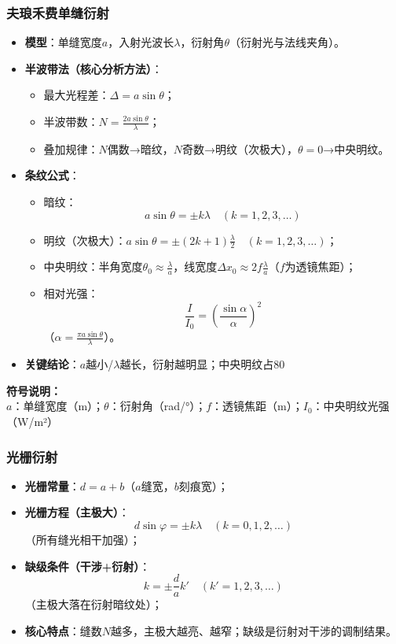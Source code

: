 \subsubsection{夫琅禾费单缝衍射}
\begin{itemize}
    \item \textbf{模型}：单缝宽度$a$，入射光波长$\lambda$，衍射角$\theta$（衍射光与法线夹角）。
    \item \textbf{半波带法（核心分析方法）}：
          \begin{itemize}
              \item 最大光程差：$\Delta = a\sin\theta$；
              \item 半波带数：$N = \frac{2a\sin\theta}{\lambda}$；
              \item 叠加规律：$N$偶数→暗纹，$N$奇数→明纹（次极大），$\theta=0$→中央明纹。
          \end{itemize}
    \item \textbf{条纹公式}：
          \begin{itemize}
              \item 暗纹：
                    \[
                    a\sin\theta = \pm k\lambda \quad (k=1,2,3,\dots)
                    \]
              \item 明纹（次极大）：$a\sin\theta = \pm (2k+1)\frac{\lambda}{2} \quad (k=1,2,3,\dots)$；
              \item 中央明纹：半角宽度$\theta_0 \approx \frac{\lambda}{a}$，线宽度$\Delta x_0 \approx 2f\frac{\lambda}{a}$（$f$为透镜焦距）；
              \item 相对光强：
                    \[
                    \frac{I}{I_0} = \left( \frac{\sin\alpha}{\alpha} \right)^2
                    \]（$\alpha = \frac{\pi a\sin\theta}{\lambda}$）。
          \end{itemize}
    \item \textbf{关键结论}：$a$越小/$\lambda$越长，衍射越明显；中央明纹占80%
\end{itemize}

\textbf{符号说明：} \\
$a$：单缝宽度（m）；\quad $\theta$：衍射角（rad/°）；\quad $f$：透镜焦距（m）；\quad $I_0$：中央明纹光强（W/m²）
\vspace{0.5em}

\subsubsection{光栅衍射}
\begin{itemize}
    \item \textbf{光栅常量}：$d = a + b$（$a$缝宽，$b$刻痕宽）；
    \item \textbf{光栅方程（主极大）}：
          \[
          d\sin\varphi = \pm k\lambda \quad (k=0,1,2,\dots)
          \]（所有缝光相干加强）；
    \item \textbf{缺级条件（干涉+衍射）}：
          \[
          k = \pm \frac{d}{a}k' \quad (k'=1,2,3,\dots)
          \]（主极大落在衍射暗纹处）；
    \item \textbf{核心特点}：缝数$N$越多，主极大越亮、越窄；缺级是衍射对干涉的调制结果。
\end{itemize}

